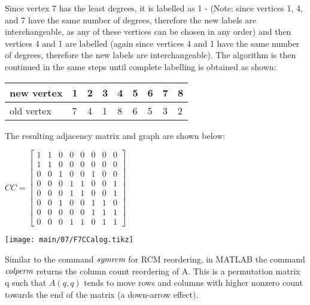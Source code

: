 \rmfamily
\noindent
\vskip 5pt
Since vertex 7 has the least degrees, it is labelled as 1 - (Note: since
vertices 1, 4, and 7 have the same number of degrees, therefore the new labels
are interchangeable, as any of these vertices can be chosen in any order) and
then vertices 4 and 1 are labelled (again since vertices 4 and 1 have the same
number of degrees, therefore the new labels are interchangeable). The algorithm
is then continued in the same steps until complete labelling is obtained as
shown:
\noindent
  \begin{center}
    \begin{tabular}{ l | l l l l l l l l }
    new vertex   & 1 & 2 & 3 & 4 & 5 & 6 & 7 & 8 \\
    \hline
    old vertex   & 7 & 4 & 1 & 8 & 6 & 5 & 3 & 2 \\
  \end{tabular}
\end{center}
\noindent
\vskip 7pt
The resulting adjacency matrix and graph are shown below:
\begin{table}[H]
  \begin{minipage}[b]{0.49\linewidth}
    \vskip 5pt
    \begin{center}
      $CC=
      \begin{bmatrix}
        1 & 1 & 0 & 0 & 0 & 0 & 0 & 0 \\
        1 & 1 & 0 & 0 & 0 & 0 & 0 & 0 \\
        0 & 0 & 1 & 0 & 0 & 1 & 0 & 0 \\
        0 & 0 & 0 & 1 & 1 & 0 & 0 & 1 \\
        0 & 0 & 0 & 1 & 1 & 0 & 0 & 1 \\
        0 & 0 & 1 & 0 & 0 & 1 & 1 & 0 \\
        0 & 0 & 0 & 0 & 0 & 1 & 1 & 1 \\
        0 & 0 & 0 & 1 & 1 & 0 & 1 & 1
      \end{bmatrix}$
    \end{center}
    \vspace{5mm}
  \end{minipage}
  \begin{minipage}[b]{0.5\linewidth}
    \texttt{[image: main/07/F7CCalog.tikz]}
  \end{minipage}
\end{table}
\noindent
Similar to the command $\emph{symrcm}$ for RCM reordering, in MATLAB the command
$\emph{colperm}$ returns the column count reordering of A. This is a permutation
matrix q such that $A(q,q)$ tends to move rows and columns with higher nonzero
count towards the end of the matrix (a down-arrow effect).

